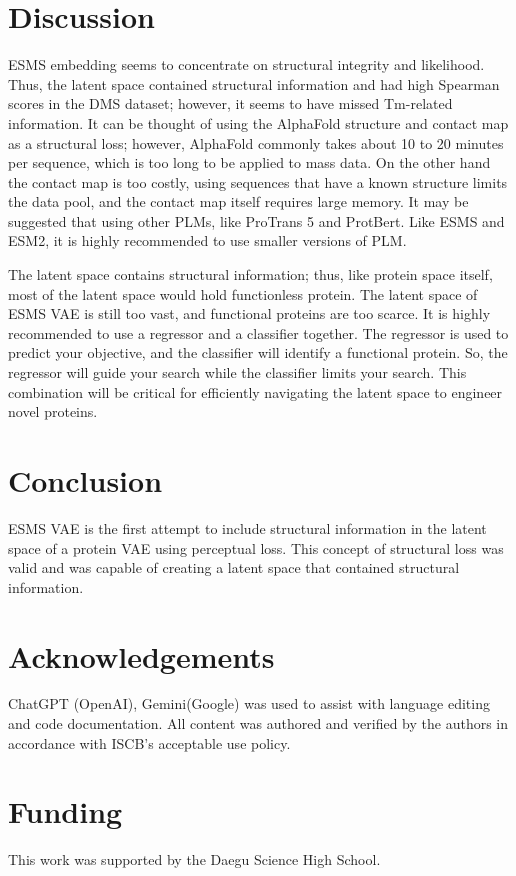 \documentclass[unnumsec,webpdf,contemporary,medium]{oup-authoring-template}
\begin{document}
\section{Discussion}\label{sec:discussion}
ESMS embedding seems to concentrate on structural integrity and likelihood. Thus, the latent space contained structural information and had high Spearman scores in the DMS dataset; however, it seems to have missed Tm-related information. It can be thought of using the AlphaFold structure and contact map as a structural loss; however, AlphaFold commonly takes about 10 to 20 minutes per sequence, which is too long to be applied to mass data. On the other hand the contact map is too costly, using sequences that have a known structure limits the data pool, and the contact map itself requires large memory. It may be suggested that using other PLMs, like ProTrans 5 and ProtBert. Like ESMS and ESM2, it is highly recommended to use smaller versions of PLM.

The latent space contains structural information; thus, like protein space itself, most of the latent space would hold functionless protein. The latent space of ESMS VAE is still too vast, and functional proteins are too scarce. It is highly recommended to use a regressor and a classifier together. The regressor is used to predict your objective, and the classifier will identify a functional protein. So, the regressor will guide your search while the classifier limits your search. This combination will be critical for efficiently navigating the latent space to engineer novel proteins.

\section{Conclusion}\label{sec:conclusion}
ESMS VAE is the first attempt to include structural information in the latent space of a protein VAE using perceptual loss. This concept of structural loss was valid and was capable of creating a latent space that contained structural information.

\section*{Acknowledgements}
ChatGPT (OpenAI), Gemini(Google) was used to assist with language editing and code documentation. All content was authored and verified by the authors in accordance with ISCB’s acceptable use policy.

\section*{Funding}
This work was supported by the Daegu Science High School.
\end{document}

